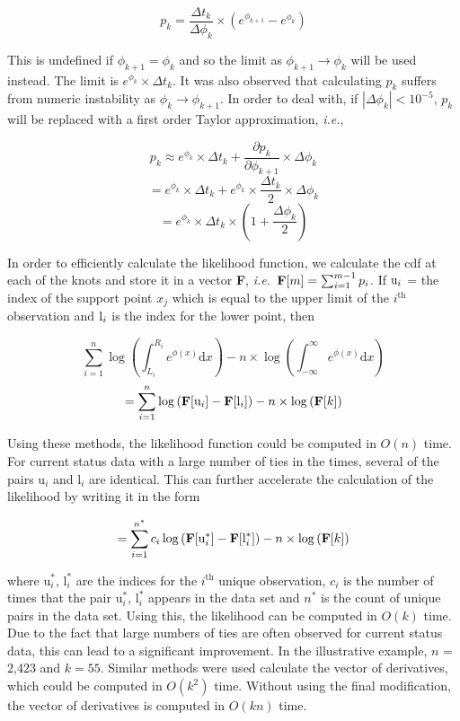	\[ p_k = \frac{\Delta t_k} {\Delta \phi_k } \times (e^{\phi_{k+1} } - e^{\phi_k } ) 
	\]
	
	This is undefined if $\phi_{k+1} = \phi_k$ and so the limit as $\phi_{k+1} \rightarrow \phi_k$ will be used instead. The limit is $e^{\phi_k} \times \Delta t_k$. It was also observed that calculating $p_k$ suffers from numeric instability as $\phi_k \rightarrow \phi_{k+1}$. In order to deal with, if $|\Delta\phi_k | < 10^{-5}$, $p_k$ will be replaced with a first order Taylor approximation, \emph{i.e.}, 
	
	\[ p_k \approx e^{\phi_k} \times \Delta t_k + \frac{\partial p_k}{\partial \phi_{k+1}} \times \Delta \phi_k 
	\]
	\[
	= e^{\phi_k} \times \Delta t_k + e^{\phi_k} \times \frac {\Delta t_k} {2} \times \Delta \phi_k
	\]
	\[
	= e^{\phi_k} \times \Delta t_k \times \left(1 + \frac{\Delta \phi_k}{2} \right)
	\]

	In order to efficiently calculate the likelihood function, we calculate the cdf at each of the knots and store it in a vector {\bf F}, \emph{i.e.}\ $ {\bf F}[m] = \sum_{i=1}^{m-1} p_i$. If $ {\text u}_i$ = the index of the support point $x_j$ which is equal to the upper limit of the $i^{\mathrm{th} } $ observation and ${\text l}_i$ is the index for the lower point, then 

	\[ \displaystyle \sum_{i = 1}^n \log \left( \int_{L_i}^{R_i} e^ { \phi(x) } \mathrm{d}x \right) - n \times \log \left(  \int_{-\infty}^{\infty} e^ { \phi(x) } \mathrm{d}x \right) 
	\]
	\[=  \displaystyle \sum_{i = 1}^n \log \left({\bf F} [\text{u}_i] - {\bf F} [\text{l}_i] \right) - n \times \log \left(  {\bf F}[k] \right) 
	\]
	
	Using these methods, the likelihood function could be computed in $O(n)$ time. For current status data with a large number of ties in the times, several of the pairs $\text{u}_i$ and $\text{l}_i$ are identical. This can further accelerate the calculation of the likelihood by writing it in the form 
	
	\[=  \displaystyle \sum_{i = 1}^{n^*} c_i\log \left({\bf F} [\text{u}_i^*] - {\bf F} [\text{l}_i^*] \right) - n \times \log \left(  {\bf F}[k] \right) 
	\]

	where $\text{u}_i^*$, $\text{l}_i^*$ are the indices for the $i^{\mathrm{th} } $ unique observation, $c_i$ is the number of times that the pair $\text{u}_i^*$, $\text{l}_i^*$ appears in the data set and $n^*$ is the count of unique pairs in the data set. Using this, the likelihood can be computed in $O(k)$ time. Due to the fact that large numbers of ties are often observed for current status data, this can lead to a significant improvement. In the illustrative example, $n$ = 2,423 and $k = 55$.
		Similar methods were used calculate the vector of derivatives, which could be computed in $O(k^2)$ time. Without using the final modification, the vector of derivatives is computed in $O(kn)$ time. 


